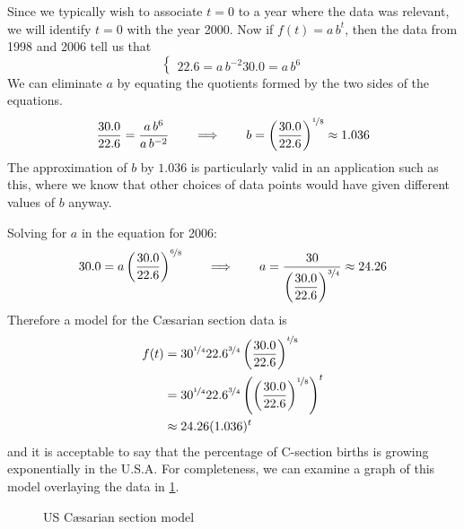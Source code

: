 \begin{pccexample}
\begin{pccsolution}
		Since we typically wish to associate $t=0$ to a year where the data was relevant, we will identify $t=0$ with the year 2000. Now if $f(t)=a\,b^t$, then the data from 1998 and 2006 tell us that 
		\[
			\begin{cases}
				22.6   =  a\,b^{-2} 
				30.0  =  a\,b^6     
			\end{cases}
		\]
		We can eliminate $a$ by equating the quotients formed by the two sides of the equations. 
		\begin{equation*}
			\frac{30.0}{22.6} = \frac{a\,b^{6}}{a\,b^{-2}}\qquad \Longrightarrow\qquad b=\left(\frac{30.0}{22.6}\right)^{\nicefrac18}\approx1.036
		\end{equation*}
		The approximation of $b$ by $1.036$ is particularly valid in an application such as this, where we know that other choices of data points would have given different values of $b$ anyway.
																	
		Solving for $a$ in the equation for 2006:
		\begin{align*}
			30.0 = a\left( \frac{30.0}{22.6} \right)^{\nicefrac{6}{8}}\qquad \Longrightarrow\qquad a=\frac{30}{\left( \dfrac{30.0}{22.6} \right)^{\nicefrac{3}{4}}}\approx 24.26 
		\end{align*}
		Therefore a model for the C\ae{}sarian section data is 
		\begin{align*}
			f(t) & = 30^{\nicefrac{1}{4}}22.6^{\nicefrac{3}{4}}\left( \frac{30.0}{22.6} \right)^{\nicefrac{t}{8}}                  \\
			     & = 30^{\nicefrac{1}{4}}22.6^{\nicefrac{3}{4}}\left(  \left( \frac{30.0}{22.6} \right)^{\nicefrac{1}{8}}\right)^t \\
			     & \approx 24.26(1.036)^t                                                                                          
		\end{align*}
		and it is acceptable to say that the percentage of C-section births is growing exponentially in the U.S.A.  For completeness, we can examine a graph of this model overlaying the data in \cref{exp:fig:CsectionsModel}.
	\end{pccsolution}
\end{pccexample}
			
\begin{figure}[!htb]
	\centering
	\caption{US C\ae{}sarian section model}
	\label{exp:fig:CsectionsModel}
\end{figure}
			
